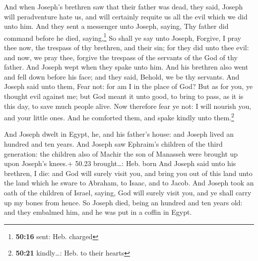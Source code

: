  And when Joseph's brethren saw that their father was
dead, they said, Joseph will peradventure hate us, and will certainly
requite us all the evil which we did unto him.  And they
sent a messenger unto Joseph, saying, Thy father did command before he
died, saying,\footnote{\textbf{50:16} sent: Heb. charged}
 So shall ye say unto Joseph, Forgive, I pray thee now,
the trespass of thy brethren, and their sin; for they did unto thee
evil: and now, we pray thee, forgive the trespass of the servants of the
God of thy father. And Joseph wept when they spake unto him.
 And his brethren also went and fell down before his
face; and they said, Behold, we be thy servants.  And
Joseph said unto them, Fear not: for am I in the place of God?
 But as for you, ye thought evil against me; but God
meant it unto good, to bring to pass, as it is this day, to save much
people alive.  Now therefore fear ye not: I will nourish
you, and your little ones. And he comforted them, and spake kindly unto
them.\footnote{\textbf{50:21} kindly\ldots: Heb. to their hearts}

 And Joseph dwelt in Egypt, he, and his father's house:
and Joseph lived an hundred and ten years.  And Joseph
saw Ephraim's children of the third generation: the children also of
Machir the son of Manasseh were brought up upon Joseph's knees.+ 50.23
brought\ldots: Heb. born  And Joseph said unto his
brethren, I die: and God will surely visit you, and bring you out of
this land unto the land which he sware to Abraham, to Isaac, and to
Jacob.  And Joseph took an oath of the children of
Israel, saying, God will surely visit you, and ye shall carry up my
bones from hence.  So Joseph died, being an hundred and
ten years old: and they embalmed him, and he was put in a coffin in
Egypt.
